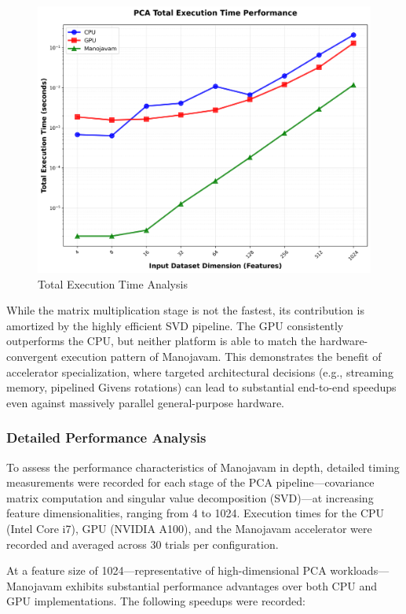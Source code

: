 \begin{figure}[H]
	\centerline{\includegraphics[scale = 0.50]{Figures/total_performance.png}}
	\caption{Total Execution Time Analysis}
	\label{fig:Total Execution Time Analysis}
\end{figure}

While the matrix multiplication stage is not the fastest, its contribution is amortized by the highly efficient SVD pipeline. The GPU consistently outperforms the CPU, but neither platform is able to match the hardware-convergent execution pattern of Manojavam. This demonstrates the benefit of accelerator specialization, where targeted architectural decisions (e.g., streaming memory, pipelined Givens rotations) can lead to substantial end-to-end speedups even against massively parallel general-purpose hardware.

\subsubsection{Detailed Performance Analysis}
To assess the performance characteristics of Manojavam in depth, detailed timing measurements were recorded for each stage of the PCA pipeline—covariance matrix computation and singular value decomposition (SVD)—at increasing feature dimensionalities, ranging from 4 to 1024. Execution times for the CPU (Intel Core i7), GPU (NVIDIA A100), and the Manojavam accelerator were recorded and averaged across 30 trials per configuration.

At a feature size of 1024—representative of high-dimensional PCA workloads—Manojavam exhibits substantial performance advantages over both CPU and GPU implementations. The following speedups were recorded:

